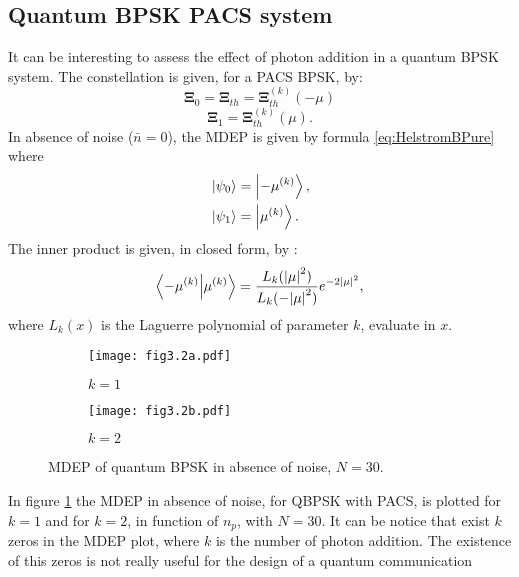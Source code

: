     \subsection{Quantum BPSK PACS system}
    It can be interesting to assess the effect of photon addition in a quantum BPSK system.
    The constellation is given, for a PACS BPSK, by:
    \begin{equation}
        \pmb{\Xi}_0 =  \pmb{\Xi}_{th} = \pmb{\Xi}_{th}^{(k)}(-\mu)
    \end{equation}
    \begin{equation*}
        \pmb{\Xi}_1 =  \pmb{\Xi}_{th}^{(k)}(\mu).
    \end{equation*}
    In absence of noise ($\bar{n}=0$), the MDEP is given by formula \ref{eq:HelstromBPure} where
    \begin{equation}
        \begin{split}
            &\ket{\psi_0}=\ket{-\mu^{(k)}},\\
            &\ket{\psi_1}=\ket{\mu^{(k)}}.
        \end{split}
    \end{equation}
    The inner product is given, in closed form, by \cite{PACSDisc}:
    \begin{equation}
        \braket{-\mu^{(k)}}{\mu^{(k)}} = \frac{L_k(\absolutevalue{\mu}^2)}{L_k(-\absolutevalue{\mu}^2)}
        e^{-2\absolutevalue{\mu}^2},
    \end{equation}
    where $L_k(x)$ is the Laguerre polynomial of parameter $k$, evaluate in $x$.
    \begin{figure}[ht]
        \begin{subfigure}{0.49\textwidth}
            \texttt{[image: fig3.2a.pdf]}
            \caption{$k=1$}
        \end{subfigure}
        \begin{subfigure}{0.49\textwidth}
            \texttt{[image: fig3.2b.pdf]}
            \caption{$k=2$}
        \end{subfigure}
        \caption{MDEP of quantum BPSK in absence of noise, $N=30$.}
        \label{fig:3.2}
    \end{figure}
    In figure \ref{fig:3.2} the MDEP in absence of noise, for QBPSK with PACS, is plotted for
    $k=1$ and for $k=2$, in function of $n_p$, with $N=30$. It can be notice that exist $k$ zeros
    in the MDEP plot, where $k$ is the number of photon addition.
    The existence of this zeros is not really useful for the design of a quantum communication
